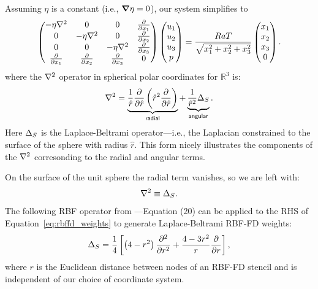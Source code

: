 Assuming $\eta$ is a constant (i.e., $\mbox{\boldmath$ \nabla $} \eta = 0$), our system simplifies to
\begin{align}
\begin{pmatrix}
-\eta \Laplacian & 0 & 0 & \pd{}{x_1} \\ 
0 & -\eta \Laplacian & 0 & \pd{}{x_2} \\ 
0 & 0 & -\eta \Laplacian & \pd{}{x_3} \\ 
\pd{}{x_1} & \pd{}{x_2} & \pd{}{x_3} & 0 \\
\end{pmatrix} \begin{pmatrix}
u_1 \\ u_2 \\ u_3 \\ p 
\end{pmatrix} = \frac{RaT}{\sqrt{x_1^2 + x_2^2 + x_3^2}}\begin{pmatrix} x_1 \\ x_2 \\ x_3 \\ 0\end{pmatrix}.
\label{eq:stokes_constant_viscosity}
\end{align}
where the $\Laplacian$ operator in spherical polar coordinates for $\mathbb{R}^3$ is: 
\begin{align} 
\nabla^2 = \underbrace{\frac{1}{\hat{r}} \frac{\partial }{\partial \hat{r}} \left( \hat{r}^{2} \frac{\partial }{\partial \hat{r}}  \right)}_{\mathsf{radial}} + \underbrace{\frac{1}{\hat{r}^2} \Delta_{S}}_{\mathsf{angular}}. \label{eq:laplacian_in_spherical}
\end{align}
Here $\LaplaceBeltrami$ is the Laplace-Beltrami operator---i.e., the Laplacian constrained to the surface of the sphere with radius $\hat{r}$. This form nicely illustrates the components of the $\Laplacian$ corresonding to the radial and angular terms. 

On the surface of the unit sphere the radial term vanishes, so we are left with:
\begin{align}
\nabla^2 \equiv \Delta_S . 
\end{align}
The following RBF operator from \cite{WrightFlyerYuen10}---Equation (20) can be applied to the RHS of Equation~\ref{eq:rbffd_weights} to generate Laplace-Beltrami RBF-FD weights: 
\begin{align} 
\Delta_S = \frac{1}{4} \left[ \left(4-r^2\right) \frac{\partial^2 }{\partial r^2} + \frac{4-3r^2}{r} \frac{\partial }{\partial r} \right],
\end{align} 
where $r$ is the Euclidean distance between nodes of an RBF-FD stencil and is independent of our choice of coordinate system. 


